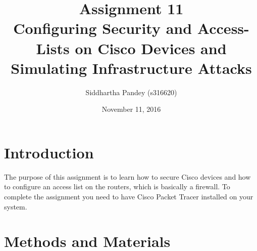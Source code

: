 \documentclass{article}
\date{November 11, 2016}
\title{\textbf{Assignment 11}\\Configuring Security and Access-Lists on Cisco Devices and
Simulating Infrastructure Attacks}
\author{Siddhartha Pandey (s316620)}
\begin{document}
\maketitle
\newpage
\tableofcontents
\newpage

\part{Introduction}

The purpose of this assignment is to learn how to secure Cisco devices and how to configure an access list on the routers, which is basically a firewall. To complete the assignment you need to have Cisco Packet Tracer installed on your system. 

\part{Methods and Materials}
\end{document}
